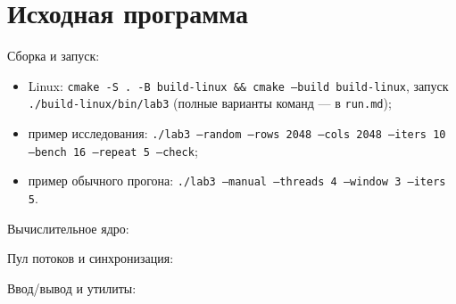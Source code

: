 \section{Исходная программа}

Сборка и запуск:
\begin{itemize}
  \item Linux: \texttt{cmake -S . -B build-linux \&\& cmake --build build-linux}, запуск
    \texttt{./build-linux/bin/lab3} (полные варианты команд --- в \texttt{run.md});
  \item пример исследования: \texttt{./lab3 --random --rows 2048 --cols 2048 --iters 10
    --bench 16 --repeat 5 --check};
  \item пример обычного прогона: \texttt{./lab3 --manual --threads 4 --window 3 --iters 5}.
\end{itemize}

Вычислительное ядро:

\begin{center}

\end{center}

\begin{center}

\end{center}

\begin{center}

\end{center}

\begin{center}

\end{center}

Пул потоков и синхронизация:

\begin{center}

\end{center}

\begin{center}

\end{center}

Ввод/вывод и утилиты:

\begin{center}

\end{center}

